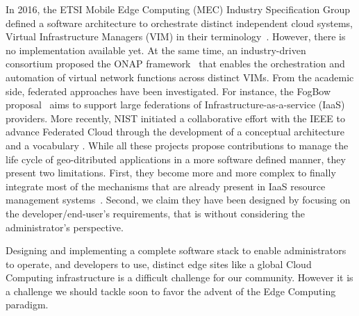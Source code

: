 In 2016, the ETSI Mobile Edge Computing (MEC)
Industry Specification Group defined  a software architecture
to orchestrate distinct independent cloud systems, \aka Virtual
Infrastructure Managers (VIM) in their terminology~\cite{7574435}. However, there is no implementation available yet.  At the
same time, an industry-driven consortium proposed
the ONAP framework~\cite{onap} that enables the orchestration and
automation of virtual network functions across distinct VIMs.  From
the academic side, federated approaches have been investigated.
For instance, the FogBow proposal~\cite{brasileiro2016fogbow} aims to
support large federations of Infrastructure-as-a-service (IaaS)
providers. More recently, NIST %
initiated a collaborative effort with the IEEE
to advance Federated Cloud through the development
of a conceptual architecture and a vocabulary
.
%
While all these projects propose contributions to manage the life cycle of
geo-ditributed applications in a more software defined manner, they present two
limitations. First, they become more and more complex to finally
integrate most of the mechanisms that are already present in
IaaS resource management systems~\cite{moreno2012csp, OpenStackCascading}.  Second,
we claim they have been designed by focusing on the developer/end-user's
requirements, that is without considering the administrator's
perspective.

Designing and implementing a complete software stack to enable
administrators to operate, and developers to use, distinct edge sites
like a global Cloud Computing infrastructure is a difficult challenge
for our community. However it is a challenge we should tackle soon to
favor the advent of the Edge Computing paradigm.

